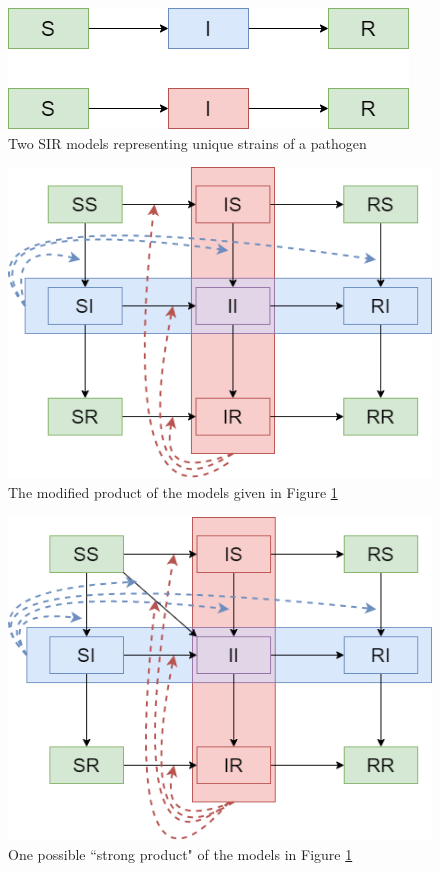 \begin{appendices}
\begin{figure}
    \centering
    \includegraphics[width=\textwidth]{images/multistrain_SIR.png}
    \caption{Two SIR models representing unique strains of a pathogen}
    \label{fig:multistrain_sir}
\end{figure}

\begin{figure}
    \centering
    \includegraphics[width=\textwidth]{images/multistrain_modified_product.png}
    \caption{The modified product of the models given in Figure \ref{fig:multistrain_sir}}
    \label{fig:modified_multistrain_product}
\end{figure}

\begin{figure}
    \centering
    \includegraphics[width=\textwidth]{images/strong_product_type_1.png}
    \caption{One possible “strong product" of the models in Figure \ref{fig:multistrain_sir}}
    \label{fig:strong_product_1}
\end{figure}


\end{appendices}
